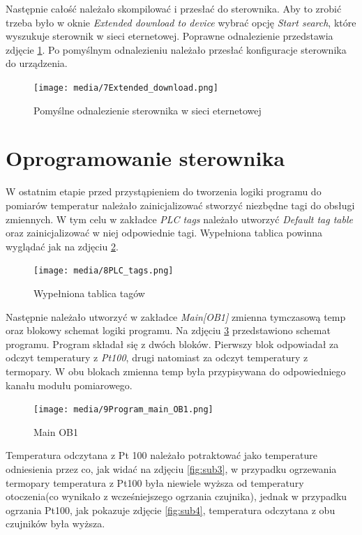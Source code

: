 \documentclass{article}
\begin{document}
\newpage
Następnie całość należało skompilować i przesłać do sterownika. 
Aby to zrobić trzeba było w oknie \textit{Extended download to device} wybrać opcję \textit{Start search}, które wyszukuje sterownik w sieci eternetowej. Poprawne odnalezienie przedstawia zdjęcie \ref{fig:Extdown}. Po pomyślnym odnalezieniu należało przesłać konfiguracje sterownika do urządzenia. 
\begin{figure}[H]
    \centering
    \texttt{[image: media/7Extended\_download.png]}
    \caption{Pomyślne odnalezienie sterownika w sieci eternetowej}
    \label{fig:Extdown}    
\end{figure}


\newpage
\section{Oprogramowanie sterownika}
W ostatnim etapie przed przystąpieniem do tworzenia logiki programu do pomiarów temperatur należało zainicjalizować stworzyć niezbędne tagi do obsługi zmiennych. W tym celu w zakładce \textit{PLC tags} należało utworzyć \textit{Default tag table} oraz zainicjalizować w niej odpowiednie tagi. Wypełniona tablica powinna wyglądać jak na zdjęciu \ref{fig:tagi}.

\begin{figure}[H]
    \centering
    \texttt{[image: media/8PLC\_tags.png]}
    \caption{Wypełniona tablica tagów}
    \label{fig:tagi}    
\end{figure}


\newpage
Następnie należało utworzyć w zakładce \textit{Main[OB1]} zmienna tymczasową temp oraz blokowy schemat logiki programu. Na zdjęciu \ref{fig:bloki} przedstawiono schemat programu. Program składał się z dwóch bloków. Pierwszy blok odpowiadał za odczyt temperatury z \textit{Pt100}, drugi natomiast za odczyt temperatury z termopary. W obu blokach zmienna temp była przypisywana do odpowiedniego kanału modułu pomiarowego.

\begin{figure}[H]
    \centering
    \texttt{[image: media/9Program\_main\_OB1.png]}
    \caption{Main OB1}
    \label{fig:bloki}    
\end{figure}


\newpage
Temperatura odczytana z Pt 100 należało potraktować jako temperature odniesienia przez co, jak widać na zdjęciu \ref{fig:sub3}, w przypadku ogrzewania termopary temperatura z Pt100 była niewiele wyższa od temperatury otoczenia(co wynikało z wcześniejszego ogrzania czujnika), jednak w przypadku ogrzania Pt100, jak pokazuje zdjęcie \ref{fig:sub4}, temperatura odczytana z obu czujników była wyższa. 
\end{document}
